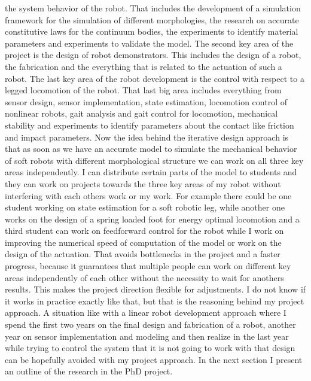 the system behavior of the robot. That includes the development of a simulation framework for the simulation of different morphologies, the research on accurate constitutive laws for the 
continuum bodies, the experiments to identify material parameters and experiments to validate the model. The second key area of the project is the design of robot demonstrators. This
includes the design of a robot, the fabrication and the everything that is related to the actuation of such a robot. The last key area of the robot development is the control with
respect to a legged locomotion of the robot. That last big area includes everything from sensor design, sensor implementation, state estimation, locomotion control of nonlinear robots,
gait analysis and gait control for locomotion, mechanical stability and experiments to identify parameters about the contact like friction and impact parameters. 
%
Now the idea behind the iterative design approach is that as soon as we have an accurate model to simulate the mechanical behavior of soft robots with different morphological structure
we can work on all three key areas independently. I can distribute certain parts of the model to students and they can work on projects towards the three key areas of my robot without
interfering with each others work or my work.
%
For example there could be one student working on state estimation for a soft robotic leg, while another one works on the design of a spring loaded foot for energy optimal
 locomotion and a third student can work on feedforward control for the robot while I work on improving the numerical speed of computation of the model or work on the design of 
 the actuation.
%
That avoids bottlenecks in the project and a faster progress, because it guarantees that multiple people can work on different key areas independently of each other without the
 necessity to wait for anothers results. This makes the project direction flexible for adjustments. I do not know if it works in practice exactly like that, but that is the reasoning behind
 my project approach.
%
A situation like with a linear robot development approach where I spend the first two years on the final design and fabrication of a robot, another year on sensor implementation
 and modeling and then realize in the last year while trying to control the system that it is not going to work with that design can be hopefully avoided with my project approach.
%
%
In the next section I present an outline of the research in the PhD project.
%
